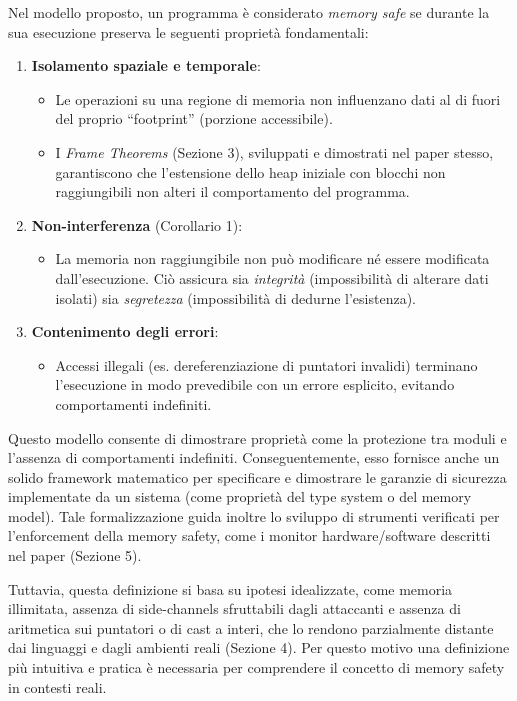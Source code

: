 Nel modello proposto, un programma è considerato \textit{memory safe} se durante
la sua esecuzione preserva le seguenti proprietà fondamentali:
\begin{enumerate}
  \item \textbf{Isolamento spaziale e temporale}:
    \begin{itemize}
      \item Le operazioni su una regione di memoria non influenzano dati al di fuori
        del proprio ``footprint'' (porzione accessibile).

      \item I \textit{Frame Theorems} (Sezione 3), sviluppati e dimostrati nel paper
        stesso, garantiscono che l'estensione dello heap iniziale con blocchi
        non raggiungibili non alteri il comportamento del programma.
    \end{itemize}

  \item \textbf{Non-interferenza} (Corollario 1):
    \begin{itemize}
      \item La memoria non raggiungibile non può modificare né essere modificata
        dall'esecuzione. Ciò assicura sia \textit{integrità} (impossibilità di
        alterare dati isolati) sia \textit{segretezza} (impossibilità di dedurne
        l'esistenza).
    \end{itemize}

  \item \textbf{Contenimento degli errori}:
    \begin{itemize}
      \item Accessi illegali (es. dereferenziazione di puntatori invalidi)
        terminano l'esecuzione in modo prevedibile con un errore esplicito, evitando
        comportamenti indefiniti.
    \end{itemize}
\end{enumerate}

Questo modello consente di dimostrare proprietà come la protezione tra moduli e
l'assenza di comportamenti indefiniti. Conseguentemente, esso fornisce anche un
solido framework matematico per specificare e dimostrare le garanzie di
sicurezza implementate da un sistema (come proprietà del type system o del memory
model). Tale formalizzazione guida inoltre lo sviluppo di strumenti verificati per
l'enforcement della memory safety, come i monitor hardware/software descritti
nel paper (Sezione 5).

Tuttavia, questa definizione si basa su ipotesi idealizzate, come memoria
illimitata, assenza di side-channels sfruttabili dagli attaccanti e assenza di aritmetica
sui puntatori o di cast a interi, che lo rendono parzialmente distante dai
linguaggi e dagli ambienti reali (Sezione 4). Per questo motivo una definizione più
intuitiva e pratica è necessaria per comprendere il concetto di memory safety in
contesti reali.

